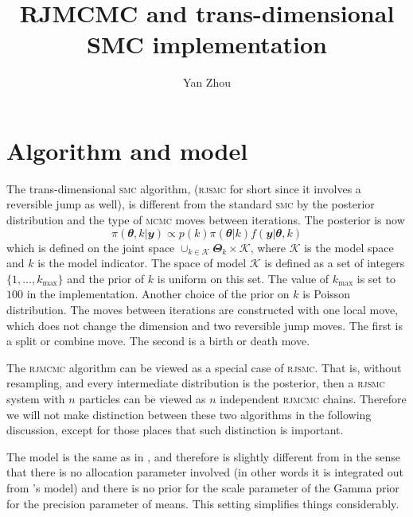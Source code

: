 \documentclass[11pt, linespread = 1.1, lines=40, lineratio = 30, bib,
fontset = Minion]{marticle}
\def\mcmc{\textsc{mcmc}\xspace}
\def\rjmcmc{\textsc{rjmcmc}\xspace}
\def\rjsmc{\textsc{rjsmc}\xspace}
\def\smc{\textsc{smc}\xspace}
\def\btheta{\mathbfit{\theta}}
\def\bTheta{\mathbfit{\Theta}}
\def\by{\mathbfit{y}}
\def\K{\mathcal{K}}
\def\kmax{k_{\mathrm{max}}}
\begin{document}
  \title{RJMCMC and trans-dimensional SMC implementation}
  \author{Yan Zhou}
  \maketitle

  \section{Algorithm and model}

  The trans-dimensional \smc algorithm, (\rjsmc for short since it involves a
  reversible jump as well), is different from the standard \smc by the
  posterior distribution and the type of \mcmc moves between iterations. The
  posterior is now
  \begin{equation}
    \pi(\btheta,k|\by) \propto p(k)\pi(\btheta|k)f(\by|\btheta,k)
  \end{equation}
  which is defined on the joint space $\cup_{k\in\K}\bTheta_k\times\K$, where
  $\K$ is the model space and $k$ is the model indicator. The space of model
  $\K$ is defined as a set of integers $\{1,\dots,\kmax\}$ and the prior of
  $k$ is uniform on this set. The value of $\kmax$ is set to $100$ in the
  implementation. Another choice of the prior on $k$ is Poisson distribution.
  The moves between iterations are constructed with one local move, which does
  not change the dimension and two reversible jump moves. The first is a split
  or combine move. The second is a birth or death move.

  The \rjmcmc algorithm can be viewed as a special case of \rjsmc. That is,
  without resampling, and every intermediate distribution is the posterior,
  then a \rjsmc system with $n$ particles can be viewed as $n$ independent
  \rjmcmc chains. Therefore we will not make distinction between these two
  algorithms in the following discussion, except for those places that such
  distinction is important.

  The model is the same as in \textcite{DelMoral:2006hc}, and therefore is
  slightly different from \textcite{Richardson:1997ea} in the sense that there
  is no allocation parameter involved (in other words it is integrated out
  from \textcite{Richardson:1997ea}'s model) and there is no prior for the
  scale parameter of the Gamma prior for the precision parameter of means.
  This setting simplifies things considerably.
\end{document}
